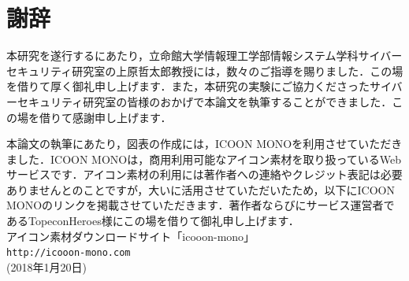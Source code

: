 \documentclass[10pt, a4paper]{jreport}
\begin{document}
\chapter*{謝辞}
本研究を遂行するにあたり，立命館大学情報理工学部情報システム学科サイバーセキュリティ研究室の上原哲太郎教授には，数々のご指導を賜りました．この場を借りて厚く御礼申し上げます．また，本研究の実験にご協力くださったサイバーセキュリティ研究室の皆様のおかげで本論文を執筆することができました．この場を借りて感謝申し上げます．

本論文の執筆にあたり，図表の作成には，ICOON MONOを利用させていただきました．ICOON MONOは，商用利用可能なアイコン素材を取り扱っているWebサービスです．アイコン素材の利用には著作者への連絡やクレジット表記は必要ありませんとのことですが，大いに活用させていただいたため，以下にICOON MONOのリンクを掲載させていただきます．著作者ならびにサービス運営者であるTopeconHeroes様にこの場を借りて御礼申し上げます．\\

\noindent
アイコン素材ダウンロードサイト「icooon-mono」\\
\verb|http://icooon-mono.com|\\
(2018年1月20日)
\end{document}
